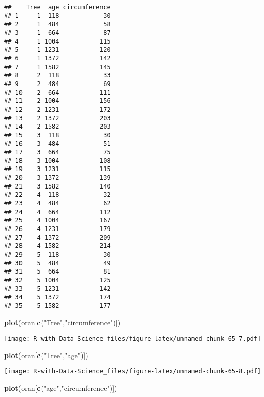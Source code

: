\documentclass[
]{article}
\newenvironment{Shaded}{\begin{snugshade}}{\end{snugshade}}
\newcommand{\FunctionTok}[1]{\textcolor[rgb]{0.13,0.29,0.53}{\textbf{#1}}}
\newcommand{\NormalTok}[1]{#1}
\newcommand{\StringTok}[1]{\textcolor[rgb]{0.31,0.60,0.02}{#1}}
\begin{document}
\begin{verbatim}
##    Tree  age circumference
## 1     1  118            30
## 2     1  484            58
## 3     1  664            87
## 4     1 1004           115
## 5     1 1231           120
## 6     1 1372           142
## 7     1 1582           145
## 8     2  118            33
## 9     2  484            69
## 10    2  664           111
## 11    2 1004           156
## 12    2 1231           172
## 13    2 1372           203
## 14    2 1582           203
## 15    3  118            30
## 16    3  484            51
## 17    3  664            75
## 18    3 1004           108
## 19    3 1231           115
## 20    3 1372           139
## 21    3 1582           140
## 22    4  118            32
## 23    4  484            62
## 24    4  664           112
## 25    4 1004           167
## 26    4 1231           179
## 27    4 1372           209
## 28    4 1582           214
## 29    5  118            30
## 30    5  484            49
## 31    5  664            81
## 32    5 1004           125
## 33    5 1231           142
## 34    5 1372           174
## 35    5 1582           177
\end{verbatim}

\begin{Shaded}
\begin{Highlighting}[]
\FunctionTok{plot}\NormalTok{(oran[}\FunctionTok{c}\NormalTok{(}\StringTok{"Tree"}\NormalTok{,}\StringTok{"circumference"}\NormalTok{)])}
\end{Highlighting}
\end{Shaded}

\texttt{[image: R-with-Data-Science\_files/figure-latex/unnamed-chunk-65-7.pdf]}

\begin{Shaded}
\begin{Highlighting}[]
\FunctionTok{plot}\NormalTok{(oran[}\FunctionTok{c}\NormalTok{(}\StringTok{"Tree"}\NormalTok{,}\StringTok{"age"}\NormalTok{)])}
\end{Highlighting}
\end{Shaded}

\texttt{[image: R-with-Data-Science\_files/figure-latex/unnamed-chunk-65-8.pdf]}

\begin{Shaded}
\begin{Highlighting}[]
\FunctionTok{plot}\NormalTok{(oran[}\FunctionTok{c}\NormalTok{(}\StringTok{"age"}\NormalTok{,}\StringTok{"circumference"}\NormalTok{)])}
\end{Highlighting}
\end{Shaded}
\end{document}
